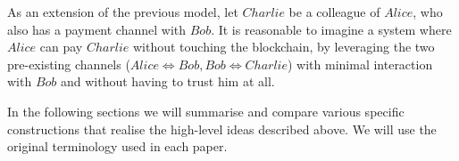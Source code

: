   As an extension of the previous model, let $Charlie$ be a colleague of $Alice$, who also
  has a payment channel with $Bob$. It is reasonable to imagine a system where $Alice$ can
  pay $Charlie$ without touching the blockchain, by leveraging the two pre-existing
  channels ($Alice \Leftrightarrow Bob, Bob \Leftrightarrow Charlie$) with minimal
  interaction with $Bob$ and without having to trust him at all.

  In the following sections we will summarise and compare various specific constructions
  that realise the high-level ideas described above. We will use the original terminology
  used in each paper.
